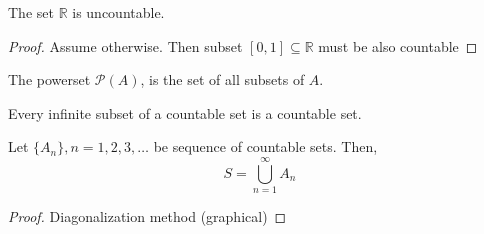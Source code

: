 \begin{theorem} The set $\mathbb{R}$ is uncountable.
    \begin{proof}
        Assume otherwise. Then subset $[0,1] \subseteq \mathbb{R}$ must be also countable
    \end{proof}
\end{theorem}
\begin{definition} The powerset $\mathcal{P}(A)$, is the set of all subsets of $A$.
\end{definition}
\begin{theorem} Every infinite subset of a countable set is a countable set.
\end{theorem}
\begin{theorem} Let $\{ A_n\}, n = 1,2,3, \ldots$ be sequence of countable sets. Then,
    \[ S = \bigcup_{n=1}^{\infty} A_n\]
    \begin{proof} Diagonalization method (graphical)
    \end{proof}
\end{theorem}
